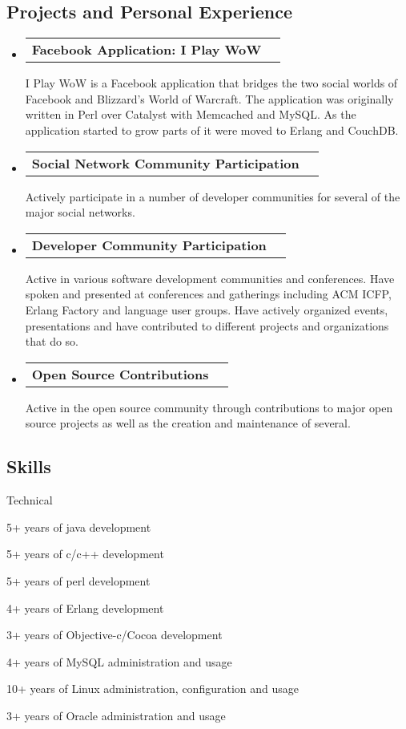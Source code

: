 \documentclass[10pt,letterpaper]{article}
\makeatletter
\newenvironment{indentsection}[1]%
{\begin{list}{}%
  {\setlength{\leftmargin}{#1}}%
  \item[]%
}
{\end{list}}
\newcommand{\headerrow}[2]
{\begin{tabular*}{\linewidth}{l@{\extracolsep{\fill}}r}
  #1 &
  #2 \\
\end{tabular*}}
\makeatother
\begin{document}
\vspace{-0.4em}
\subsection*{Projects and Personal Experience}

\begin{itemize}
  \parskip=0.1em

  \item
  \headerrow
    {\textbf{Facebook Application: I Play WoW}}
    {\textbf{}}
    I Play WoW is a Facebook application that bridges the two social worlds of Facebook and Blizzard's World of Warcraft. The application was originally written in Perl over Catalyst with Memcached and MySQL. As the application started to grow parts of it were moved to Erlang and CouchDB.
  \item
  \headerrow
    {\textbf{Social Network Community Participation}}
    {\textbf{}}
    Actively participate in a number of developer communities for several of the major social networks.
  \item
  \headerrow
    {\textbf{Developer Community Participation}}
    {\textbf{}}
    Active in various software development communities and conferences. Have spoken and presented at conferences and gatherings including ACM ICFP, Erlang Factory and language user groups. Have actively organized events, presentations and have contributed to different projects and organizations that do so.
  \item
  \headerrow
    {\textbf{Open Source Contributions}}
    {\textbf{}}
    Active in the open source community through contributions to major open source projects as well as the creation and maintenance of several.
\end{itemize}

\vspace{-0.4em}
\subsection*{Skills}

\begin{indentsection}{\parindent}
Technical
\begin{itemize*}
        \item 5+ years of java development
        \item 5+ years of c/c++ development
        \item 5+ years of perl development
        \item 4+ years of Erlang development
        \item 3+ years of Objective-c/Cocoa development
        \item 4+ years of MySQL administration and usage
        \item 10+ years of Linux administration, configuration and usage
        \item 3+ years of Oracle administration and usage
\end{itemize*}

\end{indentsection}
\end{document}
